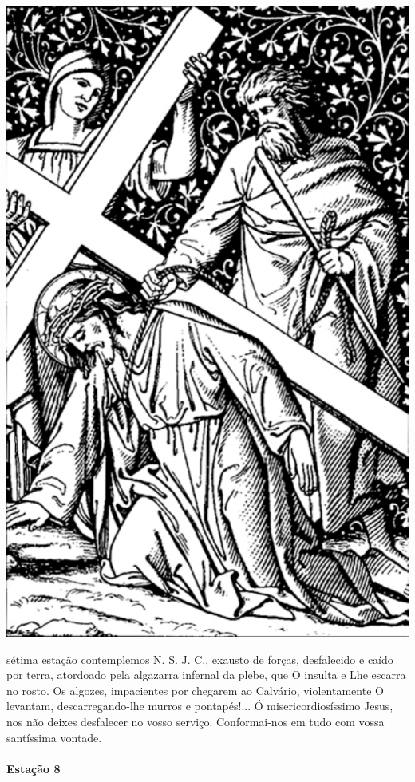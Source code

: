 \begin{nscenter}
\includegraphics[width=.8\textwidth, height=.8\textheight, keepaspectratio]{media/station7}
\end{nscenter}

 sétima estação contemplemos N. S. J. C., exausto de forças, desfalecido e caído por terra, atordoado pela algazarra infernal da plebe, que O insulta e Lhe escarra no rosto. Os algozes, impacientes por chegarem ao Calvário, violentamente O levantam, descarregando-lhe murros e pontapés!...
Ó misericordiosíssimo Jesus, nos não deixes desfalecer no vosso serviço. Conformai-nos em tudo com vossa santíssima vontade.

\newpage

\paragraph{Estação 8}

